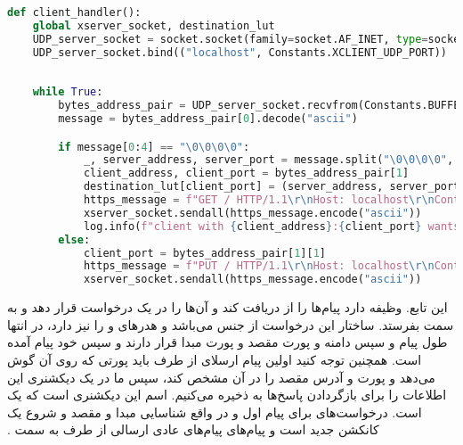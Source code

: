 \begin{latin}
\begin{lstlisting}[firstnumber=40, language=Python]
def client_handler():
    global xserver_socket, destination_lut
    UDP_server_socket = socket.socket(family=socket.AF_INET, type=socket.SOCK_DGRAM)
    UDP_server_socket.bind(("localhost", Constants.XCLIENT_UDP_PORT))
    
    
    while True:
        bytes_address_pair = UDP_server_socket.recvfrom(Constants.BUFFER_SIZE)
        message = bytes_address_pair[0].decode("ascii")

        if message[0:4] == "\0\0\0\0":
            _, server_address, server_port = message.split("\0\0\0\0", maxsplit=2)
            client_address, client_port = bytes_address_pair[1]
            destination_lut[client_port] = (server_address, server_port)
            https_message = f"GET / HTTP/1.1\r\nHost: localhost\r\nContent-Type: application/zip\r\nContent-Length: {len(message)}\r\n\r\n{client_port}\r\n\r\n{destination_lut[client_port][0]}\r\n\r\n{destination_lut[client_port][1]}\r\n\r\n{message}"
            xserver_socket.sendall(https_message.encode("ascii"))
            log.info(f"client with {client_address}:{client_port} wants to connect to {server_address}:{server_port}.")
        else:
            client_port = bytes_address_pair[1][1]
            https_message = f"PUT / HTTP/1.1\r\nHost: localhost\r\nContent-Type: application/zip\r\nContent-Length: {len(message)}\r\n\r\n{client_port}\r\n\r\n{destination_lut[client_port][0]}\r\n\r\n{destination_lut[client_port][1]}\r\n\r\n{message}"
            xserver_socket.sendall(https_message.encode("ascii"))
\end{lstlisting}
\end{latin}

‫این تابع. وظیفه دارد پیام‌ها را از  دریافت کند و آن‌ها را در یک درخواست  قرار دهد و به سمت  بفرستد. ساختار این درخواست از جنس  می‌باشد و هدرهای  و  را نیز دارد، در انتها طول پیام و سپس دامنه و پورت مقصد و پورت مبدا قرار دارند و سپس خود پیام آمده است. همچنین توجه کنید اولین پیام ارسلای از طرف  باید پورتی که روی آن گوش می‌دهد و پورت و آدرس مقصد را در آن مشخص کند، سپس ما در یک دیکشنری این اطلاعات را برای بازگردادن پاسخ‌ها به  ذخیره می‌کنیم. اسم این دیکشنری  است که یک  است. درخواست‌های  برای پیام اول و در واقع شناسایی مبدا و مقصد و شروع یک کانکشن جدید است و پیام‌های  پیام‌های عادی ارسالی از طرف  به سمت . 


